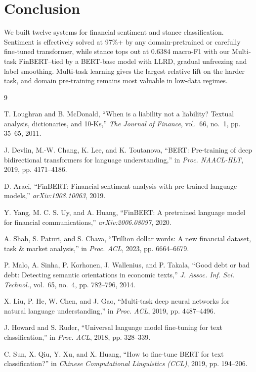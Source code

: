 \documentclass[conference, 10pt, twocolumn]{IEEEtran}
\begin{document}
\section{Conclusion}
\label{sec:conclusion}
We built twelve systems for financial sentiment and stance classification.
Sentiment is effectively solved at 97\%+ by any domain-pretrained or
carefully fine-tuned transformer, while stance tops out at 0.6384 macro-F1
with our Multi-task FinBERT--tied by a BERT-base model with
LLRD, gradual unfreezing and label smoothing. Multi-task learning gives
the largest relative lift on the harder task, and domain pre-training
remains most valuable in low-data regimes.

\begin{thebibliography}{9}

T. Loughran and B. McDonald,
``When is a liability not a liability? Textual analysis, dictionaries, and
10-Ks,'' \emph{The Journal of Finance}, vol.~66, no.~1, pp. 35--65, 2011.

J. Devlin, M.-W. Chang, K. Lee, and K. Toutanova,
``BERT: Pre-training of deep bidirectional transformers for language
understanding,'' in \emph{Proc. NAACL-HLT}, 2019, pp. 4171--4186.

D. Araci,
``FinBERT: Financial sentiment analysis with pre-trained language
models,'' \emph{arXiv:1908.10063}, 2019.

Y. Yang, M. C. S. Uy, and A. Huang,
``FinBERT: A pretrained language model for financial communications,''
\emph{arXiv:2006.08097}, 2020.

A. Shah, S. Paturi, and S. Chava,
``Trillion dollar words: A new financial dataset, task \& market
analysis,'' in \emph{Proc. ACL}, 2023, pp. 6664--6679.

P. Malo, A. Sinha, P. Korhonen, J. Wallenius, and P. Takala,
``Good debt or bad debt: Detecting semantic orientations in economic
texts,'' \emph{J. Assoc. Inf. Sci. Technol.}, vol.~65, no.~4, pp.
782--796, 2014.

X. Liu, P. He, W. Chen, and J. Gao,
``Multi-task deep neural networks for natural language understanding,''
in \emph{Proc. ACL}, 2019, pp. 4487--4496.

J. Howard and S. Ruder,
``Universal language model fine-tuning for text classification,''
in \emph{Proc. ACL}, 2018, pp. 328--339.

C. Sun, X. Qiu, Y. Xu, and X. Huang,
``How to fine-tune BERT for text classification?''
in \emph{Chinese Computational Linguistics (CCL)}, 2019, pp. 194--206.

\end{thebibliography}
\end{document}
